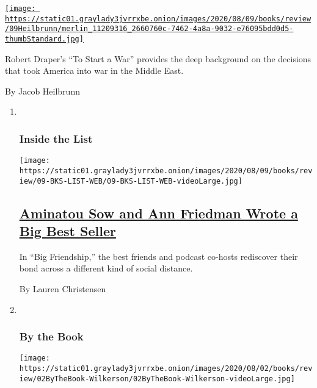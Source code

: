 \begin{enumerate}
\begin{enumerate}
    \href{/2020/07/28/books/review/to-start-a-war-robert-draper.html}{\texttt{[image: https://static01.graylady3jvrrxbe.onion/images/2020/08/09/books/review/09Heilbrunn/merlin\_11209316\_2660760c-7462-4a8a-9032-e76095bdd0d5-thumbStandard.jpg]}}

    Robert Draper's ``To Start a War'' provides the deep background on
    the decisions that took America into war in the Middle East.

    By Jacob Heilbrunn
  \end{enumerate}
\end{enumerate}

\begin{enumerate}
\def\labelenumi{\arabic{enumi}.}
\item ~
  \hypertarget{inside-the-list}{%
  \subsubsection{Inside the List}\label{inside-the-list}}

  \texttt{[image: https://static01.graylady3jvrrxbe.onion/images/2020/08/09/books/review/09-BKS-LIST-WEB/09-BKS-LIST-WEB-videoLarge.jpg]}

  \hypertarget{aminatou-sow-and-ann-friedman-wrote-a-big-best-seller}{%
  \subsection{\texorpdfstring{\href{/2020/07/30/books/review/aminatou-sow-ann-friedman-big-friendship.html}{Aminatou
  Sow and Ann Friedman Wrote a Big Best
  Seller}}{Aminatou Sow and Ann Friedman Wrote a Big Best Seller}}\label{aminatou-sow-and-ann-friedman-wrote-a-big-best-seller}}

  In ``Big Friendship,'' the best friends and podcast co-hosts
  rediscover their bond across a different kind of social distance.

  By Lauren Christensen
\item ~
  \hypertarget{by-the-book}{%
  \subsubsection{By the Book}\label{by-the-book}}

  \texttt{[image: https://static01.graylady3jvrrxbe.onion/images/2020/08/02/books/review/02ByTheBook-Wilkerson/02ByTheBook-Wilkerson-videoLarge.jpg]}

  \hypertarget{isabel-wilkerson-loves-books-that-doesnt-mean-she-treats-them-gently}{%
}
\end{enumerate}
